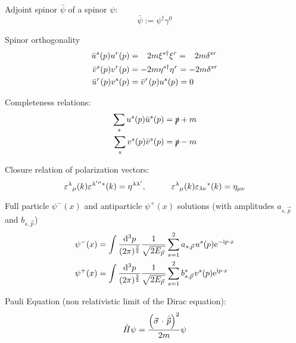			\noindent
			Adjoint spinor $\bar{\psi}$ of a spinor $\psi$:
			\begin{equation}
				\bar{\psi} := \psi^{\dagger} \gamma^0
			\end{equation}

			\noindent
			Spinor orthogonality
			\begin{equation}
				\begin{aligned}
					\bar{u}^s(p) u^r(p) &= \M 2m\xi^{s\dagger}\xi^r = \M 2m\delta^{sr} \\
					\bar{v}^s(p) v^r(p) &= - 2m\eta^{s\dagger}\eta^r = - 2m\delta^{sr} \\
					\bar{u}^r(p) v^s(p) &= \bar{v}^r(p) u^s(p) = 0
				\end{aligned}
			\end{equation}

			\noindent
			Completeness relations:
			\begin{equation}
				\begin{aligned}
					\sum_s u^s(p) \bar{u}^s(p) &= \slashed{p} + m \\
					\sum_s v^s(p) \bar{v}^s(p) &= \slashed{p} - m
				\end{aligned}
			\end{equation}

			\noindent
			Closure relation of polarization vectors:
			\begin{equation}
				\varepsilon^{\lambda}{}_{\mu}(k)\varepsilon^{\lambda^{\prime}{}^{\mu}\ast}(k)=\eta^{\lambda\lambda^{\prime}},
				\hspace{30pt}
				\varepsilon^{\lambda}{}_{\mu}(k)\varepsilon_{\lambda\nu}{}^{\ast}(k)=\eta_{\mu\nu}
			\end{equation}
			
			\noindent
			Full particle $\psi^{-}(x)$ and antiparticle $\psi^{+}(x)$ solutions (with amplitudes $a_{s,\vec{p}}$ and $b_{s,\vec{p}}$)
			\begin{equation}
				\begin{aligned}
					\psi^{-}(x) &= \int\frac{\dd^{3}p}{(2\pi)^{\frac{3}{2}}}\frac{1}{\sqrt{2E_{\vec{p}}}}\sum_{s=1}^{2}a_{s, \vec{p}}u^{s}(p)\ex^{-\i p\cdot x} \\
					\psi^{+}(x) &= \int\frac{\dd^{3}p}{(2\pi)^{\frac{3}{2}}}\frac{1}{\sqrt{2E_{\vec{p}}}}\sum_{s=1}^{2}{b_{s, \vec{p}}^{*}}v^{s}(p)\ex^{\i p\cdot x}
				\end{aligned}
			\end{equation}

			\noindent
			Pauli Equation (non relativistic limit of the Dirac equation):
			\begin{equation}
				\hat{H}\psi = \frac{\qty(\vec{\sigma}\cdot\hat{\vec{p}})^2}{2m} \psi
			\end{equation}
	
